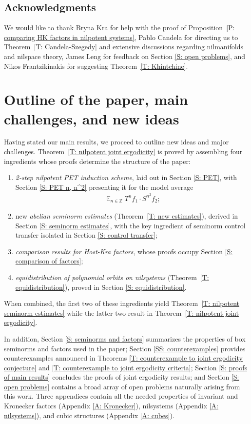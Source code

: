 \documentclass[11pt]{amsart}
\theoremstyle{definition}
\DeclareMathOperator*{\E}{\mathbb{E}}
\newcommand{\Z}{{\mathbb Z}}
\newcommand{\1}{{\mathbf{1}}}
\begin{document}
\subsection*{Acknowledgments}
We would like to thank Bryna Kra for help with the proof of Proposition~\ref{P: comparing HK factors in nilpotent systems}, Pablo Candela for directing us to Theorem~\ref{T: Candela-Szegedy} and extensive discussions regarding nilmanifolds and nilspace theory, James Leng for feedback on Section \ref{S: open problems}, and Nikos Frantzikinakis for suggesting Theorem~\ref{T: Khintchine}.

\section{Outline of the paper, main challenges, and new ideas}\label{SS: outline}
Having stated our main results, we proceed to outline new ideas and major challenges. Theorem~\ref{T: nilpotent joint ergodicity} is proved by assembling four ingredients whose proofs determine the structure of the paper:
\begin{enumerate}
    \item \textit{2-step nilpotent PET induction scheme}, laid out in Section \ref{S: PET}, with Section \ref{S: PET n, n^2} presenting it for the model average
    \begin{align}\label{E: n, n^2 0}
    \E_{n\in\Z}T^n f_1\cdot S^{n^2}f_2;
\end{align}
    \item new \textit{abelian seminorm estimates} (Theorem~\ref{T: new estimates}), derived in Section \ref{S: seminorm estimates}, with the key ingredient of seminorm control transfer isolated in Section \ref{S: control transfer}; 
    \item \textit{comparison results for Host-Kra factors}, whose proofs occupy Section \ref{S: comparison of factors};
    \item \textit{equidistribution of polynomial orbits on nilsystems} (Theorem~\ref{T: equidistribution}), proved in Section \ref{S: equidistribution}.
\end{enumerate}
When combined, the first two of these ingredients yield Theorem~\ref{T: nilpotent seminorm estimates} while the latter two result in Theorem~\ref{T: nilpotent joint ergodicity}.

In addition, Section \ref{S: seminorms and factors} summarizes the properties of box seminorms and factors used in the paper; Section \ref{SS: counterexamples} provides counterexamples announced in Theorems \ref{T: counterexample to joint ergodicity conjecture} and \ref{T: counterexample to joint ergodicity criteria}; Section \ref{S: proofs of main results} concludes the proofs of joint ergodicity results; and Section \ref{S: open problems} contains a broad array of open problems naturally arising from this work. Three appendices contain all the needed properties of invariant and Kronecker factors (Appendix \ref{A: Kronecker}), nilsystems (Appendix \ref{A: nilsystems}), and cubic structures (Appendix \ref{A: cubes}). 
\end{document}
